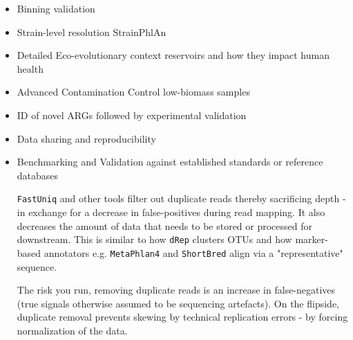 \documentclass[11pt]{report}
\begin{document}
{\begin{itemize}
\begin{itemize}
\begin{itemize}
		\item Random forests 
		\item Support vector machines
	\end{itemize}
	\item Novel Pipelines of Workflows 
	\end{itemize}
	\item Binning validation 
	\item Strain-level resolution \dotfill StrainPhlAn
	\item Detailed Eco-evolutionary context \dotfill reservoirs and how they impact human health 
	\item Advanced Contamination Control \dotfill low-biomass samples
	\item ID of novel ARGs followed by experimental validation
	\item Data sharing and reproducibility 
	\item Benchmarking and Validation against established standards or reference databases 
	
\begin{tcolorbox}[title=When to eliminate duplicates, breakable, coltitle=AntiqueWhite1]
	\texttt{FastUniq} and other tools filter out duplicate reads thereby sacrificing depth - in exchange for a decrease in false-positives during read mapping. It also decreases the amount of data that needs to be stored or processed for downstream. This is similar to how \texttt{dRep} clusters OTUs and how marker-based annotators e.g. \texttt{MetaPhlan4} and \texttt{ShortBred} align via a "representative" sequence. 
	
	The risk you run, removing duplicate reads is an increase in false-negatives (true signals otherwise assumed to be sequencing artefacts). On the flipside, duplicate removal prevents skewing by technical replication errors - by forcing normalization of the data. 
\end{tcolorbox}
	
\end{itemize}

}
\end{document}
